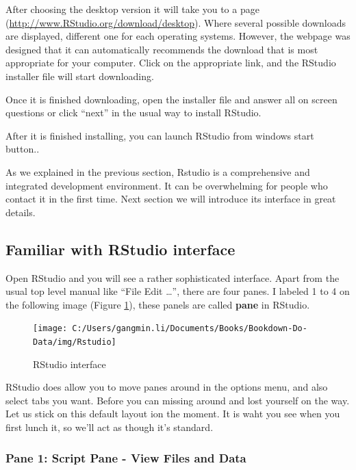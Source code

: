\documentclass[
]{book}
\begin{document}
After choosing the desktop version it will take you to a page (\url{http://www.RStudio.org/download/desktop}). Where several possible downloads are displayed, different one for each operating systems. However, the webpage was designed that it can automatically recommends the download that is most appropriate for your computer. Click on the appropriate link, and the RStudio installer file will start downloading.

Once it is finished downloading, open the installer file and answer all on screen questions or click ``next'' in the usual way to install RStudio.

After it is finished installing, you can launch RStudio from windows start button..

As we explained in the previous section, Rstudio is a comprehensive and integrated development environment. It can be overwhelming for people who contact it in the first time. Next section we will introduce its interface in great details.

\hypertarget{rs}{%
\subsection{Familiar with RStudio interface}\label{rs}}

Open RStudio and you will see a rather sophisticated interface. Apart from the usual top level manual like ``File Edit \ldots{}'', there are four panes. I labeled 1 to 4 on the following image (Figure \ref{fig:RStudio}), these panels are called \textbf{pane} in RStudio.

\begin{figure}

{\centering \texttt{[image: C:/Users/gangmin.li/Documents/Books/Bookdown-Do-Data/img/Rstudio]} 

}

\caption{RStudio interface}\label{fig:RStudio}
\end{figure}

RStudio does allow you to move panes around in the options menu, and also select tabs you want. Before you can missing around and lost yourself on the way. Let us stick on this default layout ion the moment. It is waht you see when you first lunch it, so we'll act as though it's standard.

\hypertarget{pane-1-script-pane---view-files-and-data}{%
\subsubsection*{Pane 1: Script Pane - View Files and Data}\label{pane-1-script-pane---view-files-and-data}}
\end{document}
